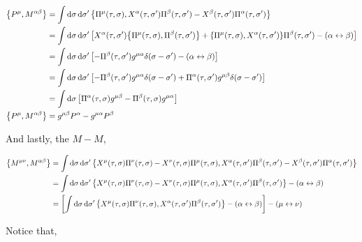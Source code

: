 \begin{align*}
    \acomm{P^\mu}{M^{\alpha\beta}}&=\int\dd{\sigma}\dd{\sigma'}\acomm{\Pi^\mu\qty(\tau,\sigma)}{X^\alpha\qty(\tau,\sigma')\Pi^\beta\qty(\tau,\sigma')-X^\beta\qty(\tau,\sigma')\Pi^\alpha\qty(\tau,\sigma')}\\
    &=\int\dd{\sigma}\dd{\sigma'}\qty[X^\alpha\qty(\tau,\sigma')\acomm{\Pi^\mu\qty(\tau,\sigma)}{\Pi^\beta\qty(\tau,\sigma')}+\acomm{\Pi^\mu\qty(\tau,\sigma)}{X^\alpha\qty(\tau,\sigma')}\Pi^\beta\qty(\tau,\sigma')-\qty(\alpha\leftrightarrow\beta)]\\
    &=\int\dd{\sigma}\dd{\sigma'}\qty[-\Pi^\beta\qty(\tau,\sigma')g^{\mu\alpha}\delta\qty(\sigma-\sigma')-\qty(\alpha\leftrightarrow\beta)]\\
    &=\int\dd{\sigma}\dd{\sigma'}\qty[-\Pi^\beta\qty(\tau,\sigma')g^{\mu\alpha}\delta\qty(\sigma-\sigma')+\Pi^\alpha\qty(\tau,\sigma')g^{\mu\beta}\delta\qty(\sigma-\sigma')]\\
    &=\int\dd{\sigma}\qty[\Pi^\alpha\qty(\tau,\sigma)g^{\mu\beta}-\Pi^\beta\qty(\tau,\sigma)g^{\mu\alpha}]\\
    \acomm{P^\mu}{M^{\alpha\beta}}&=g^{\mu\beta}P^\alpha -g^{\mu\alpha}P^\beta 
\end{align*}

And lastly, the $M-M$,

\begin{align*}
    \acomm{M^{\mu\nu}}{M^{\alpha\beta}}&=\int\dd{\sigma}\dd{\sigma'}\acomm{X^\mu\qty(\tau,\sigma)\Pi^\nu\qty(\tau,\sigma)-X^\nu\qty(\tau,\sigma)\Pi^\mu\qty(\tau,\sigma)}{X^\alpha\qty(\tau,\sigma')\Pi^\beta\qty(\tau,\sigma')-X^\beta\qty(\tau,\sigma')\Pi^\alpha\qty(\tau,\sigma')}\\
    &=\int\dd{\sigma}\dd{\sigma'}\acomm{X^\mu\qty(\tau,\sigma)\Pi^\nu\qty(\tau,\sigma)-X^\nu\qty(\tau,\sigma)\Pi^\mu\qty(\tau,\sigma)}{X^\alpha\qty(\tau,\sigma')\Pi^\beta\qty(\tau,\sigma')}-\qty(\alpha\leftrightarrow\beta)\\
    &=\qty[\int\dd{\sigma}\dd{\sigma'}\acomm{X^\mu\qty(\tau,\sigma)\Pi^\nu\qty(\tau,\sigma)}{X^\alpha\qty(\tau,\sigma')\Pi^\beta\qty(\tau,\sigma')}-\qty(\alpha\leftrightarrow\beta)]-\qty(\mu\leftrightarrow\nu)
\end{align*}

Notice that,

